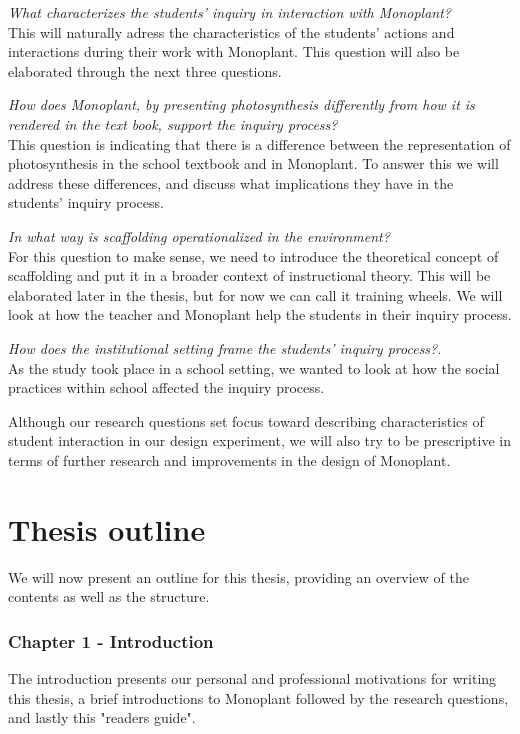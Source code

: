 \begin{noindlist}
\item \emph{What characterizes the students’ inquiry in interaction with Monoplant?}\\
This will naturally adress the characteristics of the students' actions and interactions during their work with Monoplant. This question will also be elaborated through the next three questions.
\item \emph{How does Monoplant, by presenting photosynthesis differently from how it is rendered in the text book, support the inquiry process?}\\
This question is indicating that there is a difference between the representation of photosynthesis in the school textbook and in Monoplant. To answer this we will address these differences, and discuss what implications they have in the students' inquiry process.
\item \emph{In what way is scaffolding operationalized in the environment?}\\
For this question to make sense, we need to introduce the theoretical concept of scaffolding and put it in a broader context of instructional theory. This will be elaborated later in the thesis, but for now we can call it training wheels. We will look at how the teacher and Monoplant help the students in their inquiry process.
\item \emph{How does the institutional setting frame the students' inquiry process?}.\\
As the study took place in a school setting, we wanted to look at how the social practices within school affected the inquiry process.
\end{noindlist}

Although our research questions set focus toward describing characteristics of student interaction in our design experiment, we will also try to be prescriptive in terms of further research and improvements in the design of Monoplant.

\section{Thesis outline}
We will now present an outline for this thesis, providing an overview of the contents as well as the structure. 

\subsubsection*{Chapter 1 - Introduction}
The introduction presents our personal and professional motivations for writing this thesis, a brief introductions to Monoplant followed by the research questions, and lastly this "readers guide".

